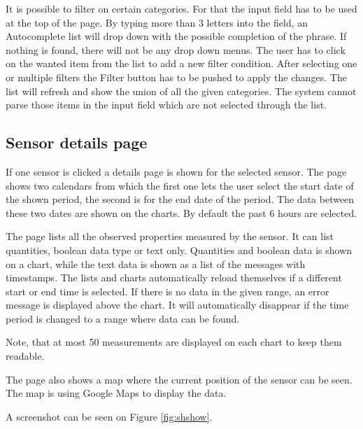 It is possible to filter on certain categories. For that the input field has to be used at the top of the page. By typing more than 3 letters into the field, an Autocomplete list will drop down with the possible completion of the phrase. If nothing is found, there will not be any drop down menus. The user has to click on the wanted item from the list to add a new filter condition. After selecting one or multiple filters the Filter button has to be pushed to apply the changes. The list will refresh and show the union of all the given categories. The system cannot parse those items in the input field which are not selected through the list.  

\subsection{Sensor details page}
If one sensor is clicked a details page is shown for the selected sensor. The page shows two calendars from which the first one lets the user select the start date of the shown period, the second is for the end date of the period. The data between these two dates are shown on the charts. By default the past 6 hours are selected. 

The page lists all the observed properties measured by the sensor. It can list quantities, boolean data type or text only. Quantities and boolean data is shown on a chart, while the text data is shown as a list of the messages with timestamps. The lists and charts automatically reload themselves if a different start or end time is selected. If there is no data in the given range, an error message is displayed above the chart. It will automatically disappear if the time period is changed to a range where data can be found. 

Note, that at most 50 measurements are displayed on each chart to keep them readable.

The page also shows a map where the current position of the sensor can be seen. The map is using Google Maps to display the data.

A screenshot can be seen on Figure \ref{fig:shshow}.


